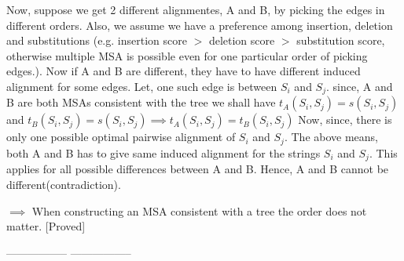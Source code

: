 \documentclass[a4paper,11pt]{article}
\begin{document}
Now, suppose we get 2 different alignmentes, A and B, by picking the edges in different orders.  Also, we assume we have a preference among insertion, deletion and substitutions (e.g. insertion score $>$ deletion score $>$ substitution score, otherwise multiple MSA is possible even for one particular order of picking edges.). Now if A and B are different, they have to have different induced alignment for some edges. Let, one such edge is between $S_i$ and $S_j$. since, A and B are both MSAs consistent with the tree  we shall have $t_A(S_i,S_j) = s(S_i,S_j)$ and $t_B(S_i,S_j) = s(S_i,S_j) \implies t_A(S_i,S_j) = t_B(S_i,S_j)$ Now, since, there is only one possible optimal pairwise alignment of $S_i$ and $S_j$. The above means, both A and B has to give same induced alignment for the strings $S_i$ and $S_j$. This applies for all possible differences between A and B. Hence, A and B cannot be different(contradiction).

$\implies$ When constructing an MSA consistent with a tree the order does not matter. [Proved]
\begin{center}
----------------- -----------------\\
\end{center}
% 
% 
\end{document}
